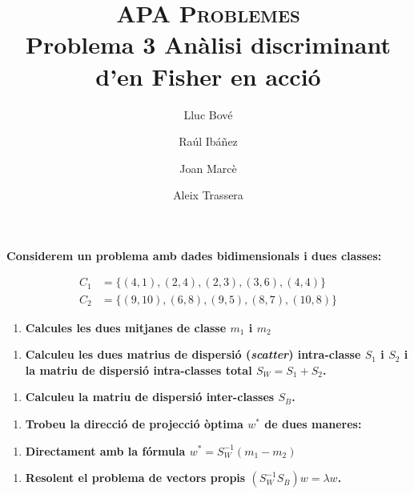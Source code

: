 \documentclass[a4paper]{article}
\title{\textsc{APA Problemes} \\ Problema 3 Anàlisi discriminant d'en Fisher en acció}
\author{Lluc Bové \and Raúl Ibáñez \and Joan Marcè \and Aleix Trassera}
\date{}
\begin{document}
\maketitle

\textbf{Considerem un problema amb dades bidimensionals i dues classes:}

\begin{align*}
	C_1 &= \{(4, 1), (2, 4), (2, 3), (3, 6), (4, 4)\} \\
	C_2 &= \{(9, 10), (6, 8), (9, 5), (8, 7), (10, 8)\}
\end{align*}

\begin{enumerate}[resume=main]
	\item \textbf{Calcules les dues mitjanes de classe $m_1$ i $m_2$}
\end{enumerate}

\begin{enumerate}[resume=main]
	\item \textbf{Calculeu les dues matrius de dispersió (\emph{scatter}) intra-classe $S_1$ i $S_2$ i la matriu de dispersió intra-classes total $S_W = S_1 + S_2$.}
\end{enumerate}

\begin{enumerate}[resume=main]
	\item \textbf{Calculeu la matriu de dispersió inter-classes $S_B$.}
\end{enumerate}

\begin{enumerate}[resume=main]
	\item \textbf{Trobeu la direcció de projecció òptima $w^*$ de dues maneres:}
\end{enumerate}

\begin{enumerate}[resume=second,label=(\alph*),itemindent=1em]
	\item \textbf{Directament amb la fórmula $w^* = S_W^{-1} (m_1 - m_2)$}
\end{enumerate}

\begin{enumerate}[resume=second,label=(\alph*),itemindent=1em]
	\item \textbf{Resolent el problema de vectors propis $(S_W^{-1}S_B)w = \lambda w$.}
\end{enumerate}
\end{document}

